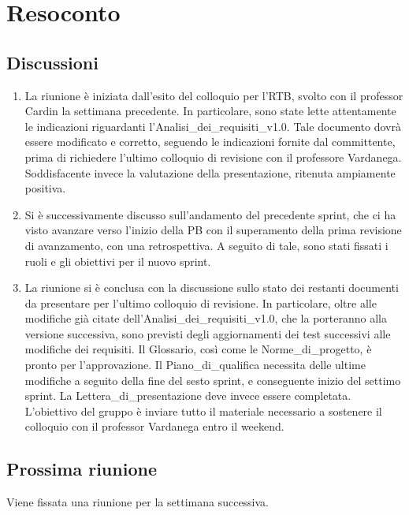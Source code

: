\section{Resoconto} \label{sec:resoconto}
\subsection{Discussioni} \label{subsec:resdiscussione}
\begin{enumerate}
    \item La riunione è iniziata dall'esito del colloquio per l'RTB, svolto con il professor Cardin la settimana precedente. In particolare, sono state lette attentamente le indicazioni riguardanti l'Analisi\_dei\_requisiti\_v1.0. Tale documento dovrà essere modificato e corretto, seguendo le indicazioni fornite dal committente, prima di richiedere l'ultimo colloquio di revisione con il professore Vardanega. Soddisfacente invece la valutazione della presentazione, ritenuta ampiamente positiva.
    
    \item Si è successivamente discusso sull'andamento del precedente sprint, che ci ha visto avanzare verso l'inizio della PB con il superamento della prima revisione di avanzamento, con una retrospettiva. A seguito di tale, sono stati fissati i ruoli e gli obiettivi per il nuovo sprint.

    \item La riunione si è conclusa con la discussione sullo stato dei restanti documenti da presentare per l'ultimo colloquio di revisione. In particolare, oltre alle modifiche già citate dell'Analisi\_dei\_requisiti\_v1.0, che la porteranno alla versione successiva, sono previsti degli aggiornamenti dei test successivi alle modifiche dei requisiti. Il Glossario, così come le Norme\_di\_progetto, è pronto per l'approvazione. Il Piano\_di\_qualifica necessita delle ultime modifiche a seguito della fine del sesto sprint, e conseguente inizio del settimo sprint. La Lettera\_di\_presentazione deve invece essere completata.\\
    L'obiettivo del gruppo è inviare tutto il materiale necessario a sostenere il colloquio con il professor Vardanega entro il weekend.
    
\end{enumerate}

\subsection{Prossima riunione} \label{subsec:riunione}
Viene fissata una riunione per la settimana successiva.